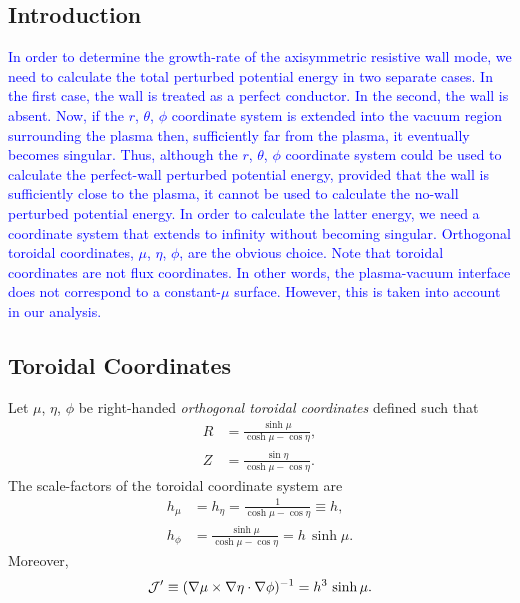 \documentclass[12pt,prb,aps]{revtex4-1}
\begin{document}
\subsection{Introduction}
\textcolor{blue}{In order to determine the growth-rate of the axisymmetric resistive wall mode, we need to calculate the total perturbed 
potential energy in two separate cases.\cite{rwm4,rwm5} In the first case, the wall is treated as a perfect conductor. In the second, the wall is
absent. Now, if the $r$, $\theta$, $\phi$ coordinate system is extended into the vacuum region surrounding the plasma then, sufficiently far from the plasma, it eventually becomes singular. Thus, although the $r$, $\theta$, $\phi$ coordinate system could be used to calculate the perfect-wall perturbed
potential energy, provided that the wall is sufficiently close to the plasma, it cannot be used to calculate the no-wall perturbed potential
energy. In order to calculate the latter energy, we need a coordinate system that extends to infinity without becoming singular. Orthogonal
toroidal coordinates, $\mu$, $\eta$, $\phi$, are the obvious choice. Note that toroidal coordinates are not flux coordinates. In other words,
the plasma-vacuum interface does not correspond to a constant-$\mu$ surface. However, this is taken into account in our analysis. }

\subsection{Toroidal Coordinates}
Let $\mu$, $\eta$, $\phi$ be right-handed {\em orthogonal toroidal coordinates}\/ defined such that\,\cite{tj,tj1,mf}
\begin{align}
R &= \frac{\sinh\mu}{\cosh\mu-\cos\eta},\\[0.5ex]
Z&=\frac{\sin\eta}{\cosh\mu-\cos\eta}.
\end{align}
The scale-factors of the toroidal coordinate system are
\begin{align}
h_\mu&=h_\eta= \frac{1}{\cosh\mu-\cos\eta}\equiv h,\\[0.5ex]
h_\phi &= \frac{\sinh\mu}{\cosh\mu-\cos\eta} = h\,\sinh\mu.
\end{align}
Moreover, 
\begin{equation}
{\cal J}' \equiv (\nabla\mu\times\nabla\eta\cdot\nabla\phi)^{-1}= h^3\,\sinh\mu.
\end{equation}
\end{document}
